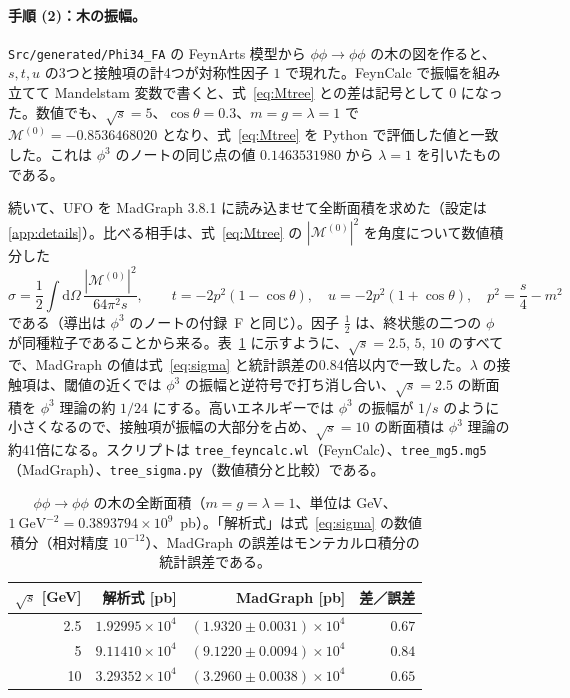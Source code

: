 \documentclass[a4paper,10pt]{ltjsarticle}
\newcommand{\dd}{\mathrm{d}}
\begin{document}
\paragraph{手順 (2)：木の振幅。}\texttt{Src/generated/Phi34\_FA} の FeynArts 模型から $\phi\phi\to\phi\phi$ の木の図を作ると、$s,t,u$ の3つと接触項の計4つが対称性因子 $1$ で現れた。FeynCalc で振幅を組み立てて Mandelstam 変数で書くと、式~\eqref{eq:Mtree} との差は記号として $0$ になった。数値でも、$\sqrt s=5$、$\cos\theta=0.3$、$m=g=\lambda=1$ で $\mathcal{M}^{(0)}=-0.8536468020$ となり、式~\eqref{eq:Mtree} を Python で評価した値と一致した。これは $\phi^3$ のノートの同じ点の値 $0.1463531980$ から $\lambda=1$ を引いたものである。

続いて、UFO を MadGraph 3.8.1 に読み込ませて全断面積を求めた（設定は\ref{app:details}）。比べる相手は、式~\eqref{eq:Mtree} の $|\mathcal{M}^{(0)}|^2$ を角度について数値積分した
\begin{equation}
\sigma=\frac12\int\!\dd\Omega\,\frac{|\mathcal{M}^{(0)}|^2}{64\pi^2s},\qquad
t=-2p^2(1-\cos\theta),\quad u=-2p^2(1+\cos\theta),\quad p^2=\frac s4-m^2
\label{eq:sigma}
\end{equation}
である（導出は $\phi^3$ のノートの付録~F と同じ）。因子 $\frac12$ は、終状態の二つの $\phi$ が同種粒子であることから来る。表~\ref{tab:tree} に示すように、$\sqrt s=2.5,\,5,\,10$ のすべてで、MadGraph の値は式~\eqref{eq:sigma} と統計誤差の0.84倍以内で一致した。$\lambda$ の接触項は、閾値の近くでは $\phi^3$ の振幅と逆符号で打ち消し合い、$\sqrt s=2.5$ の断面積を $\phi^3$ 理論の約 $1/24$ にする。高いエネルギーでは $\phi^3$ の振幅が $1/s$ のように小さくなるので、接触項が振幅の大部分を占め、$\sqrt s=10$ の断面積は $\phi^3$ 理論の約41倍になる。スクリプトは \texttt{tree\_feyncalc.wl}（FeynCalc）、\texttt{tree\_mg5.mg5}（MadGraph）、\texttt{tree\_sigma.py}（数値積分と比較）である。

\begin{table}[tbp]
\centering\small
\caption{$\phi\phi\to\phi\phi$ の木の全断面積（$m=g=\lambda=1$、単位は GeV、$1~\mathrm{GeV}^{-2}=0.3893794\times10^{9}$~pb）。「解析式」は式~\eqref{eq:sigma} の数値積分（相対精度 $10^{-12}$）、MadGraph の誤差はモンテカルロ積分の統計誤差である。}
\label{tab:tree}
\begin{tabular}{rrrr}
\toprule
$\sqrt{s}$ [GeV] & 解析式 [pb] & MadGraph [pb] & 差／誤差 \\
\midrule
2.5 & $1.92995\times10^{4}$ & $(1.9320\pm0.0031)\times10^{4}$ & $0.67$ \\
5 & $9.11410\times10^{4}$ & $(9.1220\pm0.0094)\times10^{4}$ & $0.84$ \\
10 & $3.29352\times10^{4}$ & $(3.2960\pm0.0038)\times10^{4}$ & $0.65$ \\
\bottomrule
\end{tabular}
\end{table}
\end{document}
